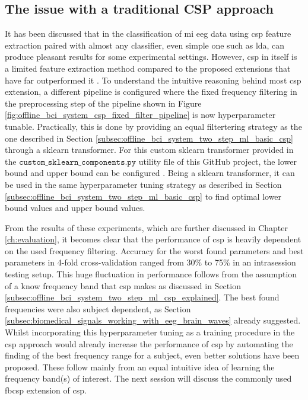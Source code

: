 \subsection{The issue with a traditional CSP approach}
\label{subsec:offline_bci_system_two_step_ml_basic_csp_issue}
It has been discussed that in the classification of \gls{mi} \gls{eeg} data using \gls{csp} feature extraction paired with almost any classifier, even simple one such as \gls{lda}, can produce pleasant results for some experimental settings.
However, \gls{csp} in itself is a limited feature extraction method compared to the proposed extensions that have far outperformed it \citep{eeg_model_fbcsp, bci_book_csp_extension, four_class_mi_CSP_good, eeg_mi_model_lda_csp}.
To understand the intuitive reasoning behind most \gls{csp} extension, a different pipeline is configured where the fixed frequency filtering in the preprocessing step of the pipeline shown in Figure \ref{fig:offline_bci_system_csp_fixed_filter_pipeline} is now hyperparameter tunable.
Practically, this is done by providing an equal filtertering strategy as the one described in Section \ref{subsec:offline_bci_system_two_step_ml_basic_csp} through a \gls{sklearn} transformer.
For this custom \gls{sklearn} transformer provided in the $\texttt{custom\_sklearn\_components.py}$ utility file of this GitHub project, the lower bound and upper bound can be configured \citep{github_project}.
Being a \gls{sklearn} transformer, it can be used in the same hyperparameter tuning strategy as described in Section \ref{subsec:offline_bci_system_two_step_ml_basic_csp} to find optimal lower bound values and upper bound values.

From the results of these experiments, which are further discussed in Chapter \ref{ch:evaluation}, it becomes clear that the performance of \gls{csp} is heavily dependent on the used frequency filtering.
Accuracy for the worst found parameters and best parameters in 4-fold cross-validation ranged from 30\% to 75\% in an intrasession testing setup.
This huge fluctuation in performance follows from the assumption of a know frequency band that \gls{csp} makes as discussed in Section \ref{subsec:offline_bci_system_two_step_ml_csp_explained}.
The best found frequencies were also subject dependent, as Section \ref{subsec:biomedical_signals_working_with_eeg_brain_waves} already suggested.
Whilst incorporating this hyperparameter tuning as a training procedure in the \gls{csp} approach would already increase the performance of \gls{csp} by automating the finding of the best frequency range for a subject, even better solutions have been proposed.
These follow mainly from an equal intuitive idea of learning the frequency band(s) of interest.
The next session will discuss the commonly used \gls{fbcsp} extension of \gls{csp}.


